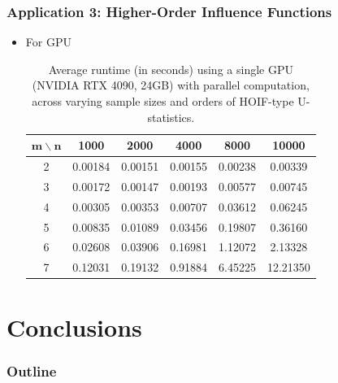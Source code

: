 \documentclass[9pt]{beamer}
\theoremstyle{mystyle}
\theoremstyle{mystyletwo}
\begin{document}
\begin{frame}
    \frametitle{Application 3: Higher-Order Influence Functions}
    \begin{itemize}
        \item For GPU
              \begin{table}[htbp]
                  \centering
                  \caption{Average runtime (in seconds) using a single GPU (NVIDIA RTX 4090, 24GB) with parallel computation, across varying sample sizes and orders of HOIF-type U-statistics.}
                  \label{tab:HOIF_GPU}
                  \begin{tabular}{cccccc}
                      \toprule
                      $\bm{m} \backslash \bm{n}$ & \textbf{1000} & \textbf{2000} & \textbf{4000} & \textbf{8000} & \textbf{10000} \\
                      \midrule
                      2                          & 0.00184       & 0.00151       & 0.00155       & 0.00238       & 0.00339        \\
                      3                          & 0.00172       & 0.00147       & 0.00193       & 0.00577       & 0.00745        \\
                      4                          & 0.00305       & 0.00353       & 0.00707       & 0.03612       & 0.06245        \\
                      5                          & 0.00835       & 0.01089       & 0.03456       & 0.19807       & 0.36160        \\
                      6                          & 0.02608       & 0.03906       & 0.16981       & 1.12072       & 2.13328        \\
                      7                          & 0.12031       & 0.19132       & 0.91884       & 6.45225       & 12.21350       \\
                      \bottomrule
                  \end{tabular}
              \end{table}
    \end{itemize}
\end{frame}



\section{Conclusions}

\begin{frame}
    \frametitle{Outline}
    \tableofcontents[currentsection, sectionstyle=show/shaded, subsectionstyle=show/shaded/shaded]
\end{frame}
\end{document}
